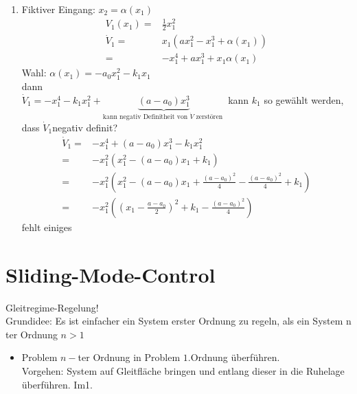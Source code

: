 \documentclass[11pt,a4paper]{article}
\begin{document}
\begin{enumerate}
\item Fiktiver Eingang: $x_2 = \alpha(x_1)$\\
\begin{align*}
V_1(x_1) = & \frac{1}{2}x_1^2\\
\dot V_1 = & x_1 (a x_1^2 - x_1^3 + \alpha(x_1) )\\
=& -x_1^4 + a x_1^3 + x_1 \alpha(x_1)
\end{align*}
Wahl: $\alpha(x_1) = -a_0 x_1^2 - k_1x_1$\\ dann\\ $\dot V_1 = -x_1^4 - k_1 x_1^2 + \underbrace{(a-a_0)x_1^3}_{\text{kann negativ Definitheit von $\dot V$ zerstören }}$
kann $k_1$ so gewählt werden, dass $\dot V_1 $negativ definit?\\
\begin{align*}
\dot V_1 = & -x_1^4 + (a-a_0)x_1^3 - k_1 x_1^2\\
=& -x_1^2(x_1^2 - (a-a_0) x_1 + k_1)\\
=&-x_1^2(x_1^2 - (a-a_0) x_1 + \frac{(a-a_0)^2}{4} - \frac{(a-a_0)^2}{4} + k_1)\\
=&-x_1^2\left( (x_1 - \frac{a-a_0}{2})^2+k_1 - \frac{(a-a_0)^2}{4} \right)
\end{align*}
fehlt einiges
\end{enumerate}
\section{Sliding-Mode-Control}
Gleitregime-Regelung!\\
Grundidee: Es ist einfacher ein System erster Ordnung zu regeln, als ein System n ter Ordnung $n>1$
\begin{itemize}
\item Problem $n-$ter Ordnung in Problem $1$.Ordnung überführen.\\
Vorgehen: System auf Gleitfläche bringen und entlang dieser in die Ruhelage überführen.
Im1.
\end{itemize}
\end{document}
